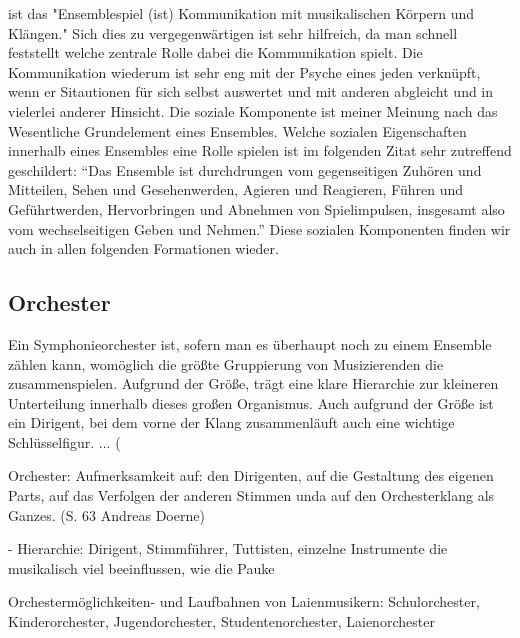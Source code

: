 ist das "Ensemblespiel (ist) Kommunikation mit musikalischen Körpern und
Klängen." \autocite[62]{doerne:umfassend_musizieren} Sich dies zu
vergegenwärtigen ist sehr hilfreich, da man schnell feststellt welche zentrale
Rolle dabei die Kommunikation spielt. Die Kommunikation wiederum ist sehr eng
mit der Psyche eines jeden verknüpft, wenn er Sitautionen für sich selbst
auswertet und mit anderen abgleicht und in vielerlei anderer Hinsicht. Die
soziale Komponente ist meiner Meinung nach das Wesentliche Grundelement eines
Ensembles. Welche sozialen Eigenschaften innerhalb eines Ensembles eine Rolle
spielen ist im folgenden Zitat sehr zutreffend geschildert: \enquote{Das
Ensemble ist durchdrungen vom gegenseitigen Zuhören und Mitteilen, Sehen und
Gesehenwerden, Agieren und Reagieren, Führen und Geführtwerden, Hervorbringen
und Abnehmen von Spielimpulsen, insgesamt also vom wechselseitigen Geben und
Nehmen.} \autocite[62]{doerne:umfassend_musizieren} Diese sozialen Komponenten
finden wir auch in allen folgenden Formationen wieder. 


\subsection{Orchester} 

Ein Symphonieorchester ist, sofern man es überhaupt noch zu einem Ensemble
zählen kann, womöglich die größte Gruppierung von Musizierenden die
zusammenspielen. Aufgrund der Größe, trägt eine klare Hierarchie zur kleineren
Unterteilung innerhalb dieses großen Organismus. Auch aufgrund der Größe ist ein
Dirigent, bei dem vorne der Klang zusammenläuft auch eine wichtige
Schlüsselfigur. ... (%

Orchester: Aufmerksamkeit auf: den Dirigenten, auf die Gestaltung des eigenen
Parts, auf das Verfolgen der anderen Stimmen unda auf den Orchesterklang als
Ganzes. (S. 63 Andreas Doerne)

- Hierarchie: Dirigent, Stimmführer, Tuttisten, einzelne Instrumente die
musikalisch viel beeinflussen, wie die Pauke

Orchestermöglichkeiten- und Laufbahnen von Laienmusikern: Schulorchester,
Kinderorchester, Jugendorchester, Studentenorchester, Laienorchester

